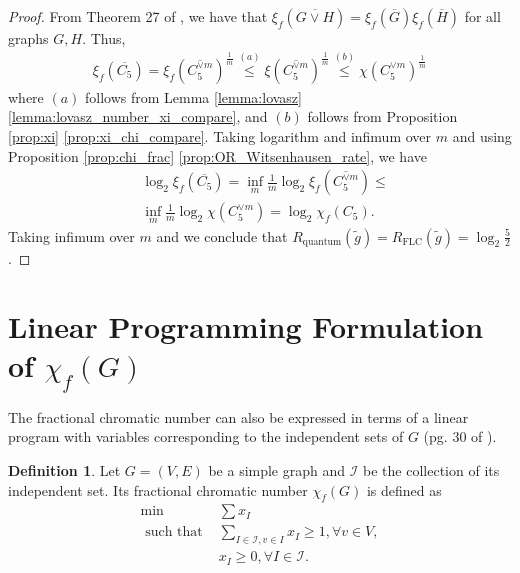 \documentclass[journal, onecolumn, draftcls]{IEEEtran}
\theoremstyle{definition}
\newtheorem{definition}{Definition}
\newcommand{\calI}{\mathcal{I}}
\begin{document}
\begin{proof}
From Theorem 27 of \cite{CubittLRSSW_14}, we have that $\xi_f(\overline{G \lor H} ) = \xi_f(\overline{G } ) \xi_f(\overline{ H} )$ for all graphs $G,H$. Thus, 
\begin{align*}
     \xi_f(\overline{C_5 } )= \xi_f(   \overline{ C_5^{\lor m} } )^{\frac{1}{m}}\overset{(a)}{\le} \xi (   \overline{ C_5^{\lor m} } )^{\frac{1}{m}}\overset{(b)}{\le} \chi (   { C_5^{\lor m} } )^{\frac{1}{m}} 
\end{align*}
where $(a)$ follows from Lemma \ref{lemma:lovasz}    \ref{lemma:lovasz_number_xi_compare}, and $(b)$ follows from Proposition \ref{prop:xi}  \ref{prop:xi_chi_compare}.
Taking logarithm and infimum over $m$ and using Proposition \ref{prop:chi_frac}  \ref{prop:OR_Witsenhausen_rate}, we have
\begin{align*}
    &\log_2\xi_f(\overline{C_5 } )=\inf_{m}\frac{1}{m} \log_2\xi_f(   \overline{ C_5^{\lor m} } )  \le\\
    &\inf_{m} \frac{1}{m}\log_2 \chi (   { C_5^{\lor m} } )  = \log_2\chi_f(C_5).
\end{align*}  
Taking infimum over $m$ and we conclude that $R_{\text{quantum}}(\tilde g) = R_{\text{FLC}}(\tilde g) = \log_2\frac{5}{2}$.
\end{proof}
  



\section{Linear Programming Formulation of $\chi_f(G)$}\label{app:chi_f_LP}
The fractional chromatic number can also be expressed in terms of a linear program with variables corresponding to the independent sets of $G$ (pg. 30 of \cite{ScheinermanU97FGT}). 
\begin{definition}\label{defi:Fraction_chromatic_number}
Let $G=(V,E)$ be a simple graph and $\calI$ be the collection of its independent set. Its fractional chromatic number $\chi_f(G)$ is defined as
\begin{align*}
    \min& \sum x_{I}\\
    \text{ such that  }& \sum_{I\in \calI, v\in I} x_I \ge 1,  \forall v\in V,\\
    &  x_I \ge 0, \forall I\in \calI.
\end{align*}
\end{definition} 
\end{document}
